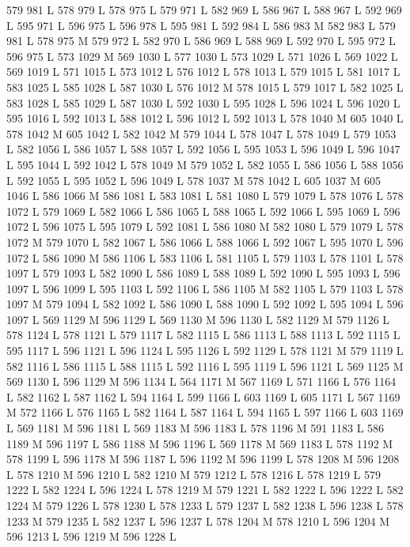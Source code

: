 {{{{{{{{{{{{{{{{{{{{{{{{{{{{{{579 981 L
578 979 L
578 975 L
579 971 L
582 969 L
586 967 L
588 967 L
592 969 L
595 971 L
596 975 L
596 978 L
595 981 L
592 984 L
586 983 M 582 983 L
579 981 L
578 975 M 579 972 L
582 970 L
586 969 L
588 969 L
592 970 L
595 972 L
596 975 L
573 1029 M 569 1030 L
577 1030 L
573 1029 L
571 1026 L
569 1022 L
569 1019 L
571 1015 L
573 1012 L
576 1012 L
578 1013 L
579 1015 L
581 1017 L
583 1025 L
585 1028 L
587 1030 L
576 1012 M 578 1015 L
579 1017 L
582 1025 L
583 1028 L
585 1029 L
587 1030 L
592 1030 L
595 1028 L
596 1024 L
596 1020 L
595 1016 L
592 1013 L
588 1012 L
596 1012 L
592 1013 L
578 1040 M 605 1040 L
578 1042 M 605 1042 L
582 1042 M 579 1044 L
578 1047 L
578 1049 L
579 1053 L
582 1056 L
586 1057 L
588 1057 L
592 1056 L
595 1053 L
596 1049 L
596 1047 L
595 1044 L
592 1042 L
578 1049 M 579 1052 L
582 1055 L
586 1056 L
588 1056 L
592 1055 L
595 1052 L
596 1049 L
578 1037 M 578 1042 L
605 1037 M 605 1046 L
586 1066 M 586 1081 L
583 1081 L
581 1080 L
579 1079 L
578 1076 L
578 1072 L
579 1069 L
582 1066 L
586 1065 L
588 1065 L
592 1066 L
595 1069 L
596 1072 L
596 1075 L
595 1079 L
592 1081 L
586 1080 M 582 1080 L
579 1079 L
578 1072 M 579 1070 L
582 1067 L
586 1066 L
588 1066 L
592 1067 L
595 1070 L
596 1072 L
586 1090 M 586 1106 L
583 1106 L
581 1105 L
579 1103 L
578 1101 L
578 1097 L
579 1093 L
582 1090 L
586 1089 L
588 1089 L
592 1090 L
595 1093 L
596 1097 L
596 1099 L
595 1103 L
592 1106 L
586 1105 M 582 1105 L
579 1103 L
578 1097 M 579 1094 L
582 1092 L
586 1090 L
588 1090 L
592 1092 L
595 1094 L
596 1097 L
569 1129 M 596 1129 L
569 1130 M 596 1130 L
582 1129 M 579 1126 L
578 1124 L
578 1121 L
579 1117 L
582 1115 L
586 1113 L
588 1113 L
592 1115 L
595 1117 L
596 1121 L
596 1124 L
595 1126 L
592 1129 L
578 1121 M 579 1119 L
582 1116 L
586 1115 L
588 1115 L
592 1116 L
595 1119 L
596 1121 L
569 1125 M 569 1130 L
596 1129 M 596 1134 L
564 1171 M 567 1169 L
571 1166 L
576 1164 L
582 1162 L
587 1162 L
594 1164 L
599 1166 L
603 1169 L
605 1171 L
567 1169 M 572 1166 L
576 1165 L
582 1164 L
587 1164 L
594 1165 L
597 1166 L
603 1169 L
569 1181 M 596 1181 L
569 1183 M 596 1183 L
578 1196 M 591 1183 L
586 1189 M 596 1197 L
586 1188 M 596 1196 L
569 1178 M 569 1183 L
578 1192 M 578 1199 L
596 1178 M 596 1187 L
596 1192 M 596 1199 L
578 1208 M 596 1208 L
578 1210 M 596 1210 L
582 1210 M 579 1212 L
578 1216 L
578 1219 L
579 1222 L
582 1224 L
596 1224 L
578 1219 M 579 1221 L
582 1222 L
596 1222 L
582 1224 M 579 1226 L
578 1230 L
578 1233 L
579 1237 L
582 1238 L
596 1238 L
578 1233 M 579 1235 L
582 1237 L
596 1237 L
578 1204 M 578 1210 L
596 1204 M 596 1213 L
596 1219 M 596 1228 L
}}}}}}}}}}}}}}}}}}}}}}}}}}}}}}
